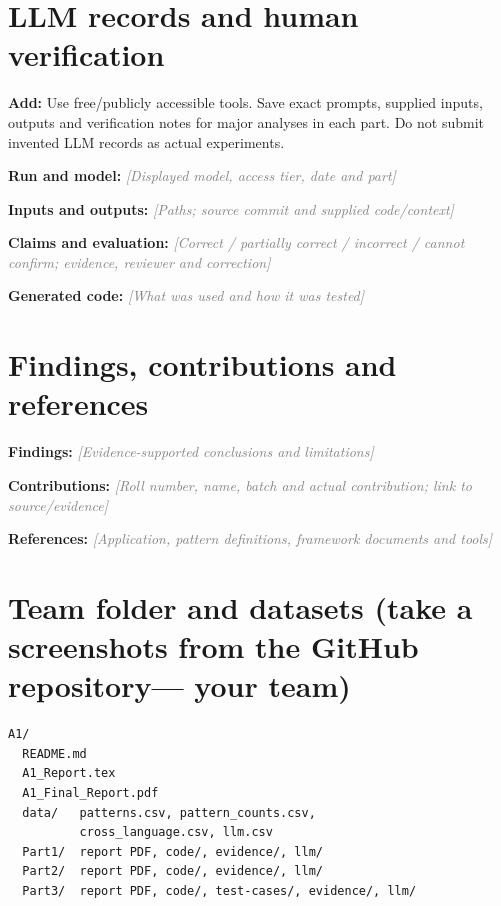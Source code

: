 \documentclass[11pt,a4paper]{article}
\newcommand{\entry}[2]{\textbf{#1:} \textcolor{gray}{\textit{[#2]}}\par}
\newcommand{\help}[1]{\textbf{Add:} #1\par}
\begin{document}
\section{LLM records and human verification}
\help{Use free/publicly accessible tools. Save exact prompts, supplied inputs, outputs and verification notes for major analyses in each part. Do not submit invented LLM records as actual experiments.}
\entry{Run and model}{Displayed model, access tier, date and part}
\entry{Inputs and outputs}{Paths; source commit and supplied code/context}
\entry{Claims and evaluation}{Correct / partially correct / incorrect / cannot confirm; evidence, reviewer and correction}
\entry{Generated code}{What was used and how it was tested}
\section{Findings, contributions and references}
\entry{Findings}{Evidence-supported conclusions and limitations}
\entry{Contributions}{Roll number, name, batch and actual contribution; link to source/evidence}
\entry{References}{Application, pattern definitions, framework documents and tools}
\section{Team folder and datasets (take a screenshots from the GitHub repository— your team)}
\begin{verbatim}
A1/
  README.md
  A1_Report.tex
  A1_Final_Report.pdf
  data/   patterns.csv, pattern_counts.csv,
          cross_language.csv, llm.csv
  Part1/  report PDF, code/, evidence/, llm/
  Part2/  report PDF, code/, evidence/, llm/
  Part3/  report PDF, code/, test-cases/, evidence/, llm/
\end{verbatim}
\end{document}
